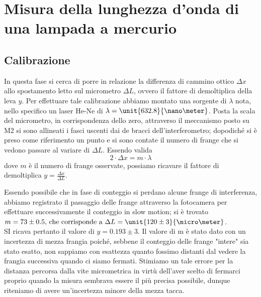 \section{Misura della lunghezza d'onda di una lampada a mercurio}
\subsection{Calibrazione}
In questa fase si cerca di porre in relazione la differenza 
di cammino ottico $\Delta x$ allo spostamento letto 
sul micrometro $\Delta L$,
ovvero il fattore di demoltiplica della leva $y$.
Per effettuare tale calibrazione abbiamo 
montato una sorgente di  $\lambda$ nota, nello specifico un laser
He-Ne di $\lambda=\unit{632.8}{\nano\meter}$.
Posta la scala del micrometro, in corrispondenza dello zero,
attraverso il meccanismo posto su M2 si sono allineati i fasci 
uscenti dai de bracci dell'interferometro;
dopodiché si è preso 
come riferimento un punto e si sono contate il numero di frange che si vedono 
passare al variare di $\Delta L$.
Essendo valida \smallskip
\begin{equation*}\label{eq:lambda}
2 \cdot \Delta x = m \cdot \lambda
 \end{equation*}
 \smallskip
dove $m$ è il numero di frange osservate, possiamo ricavare 
il fattore di demoltiplica $y=\frac{\Delta x}{\Delta L}$.

Essendo possibile che in fase di conteggio si perdano 
alcune frange di interferenza, abbiamo registrato il passaggio delle frange attraverso la fotocamera 
per effettuare successivamente il conteggio in slow motion; si è trovato
$m=73 \pm 0.5 \text{, che corrisponde a } \Delta L =\unit{120\pm 3}{\micro\meter}$.
\\
SI ricava pertanto il valore di $y= 0.193	\pm	3$.
Il valore di m è stato dato con un incertezza di mezza frangia poiché, sebbene il conteggio delle frange "intere" sia stato esatto, non sappiamo con esattezza quanto fossimo distanti dal vedere la frangia successiva quando ci siamo fermati.
Stimiamo un tale errore per la distanza percorsa dalla vite micrometrica 
in virtù dell'aver scelto di fermarci proprio quando la misura sembrava essere il più precisa possibile,
dunque riteniamo di avere un'incertezza minore della mezza tacca.
